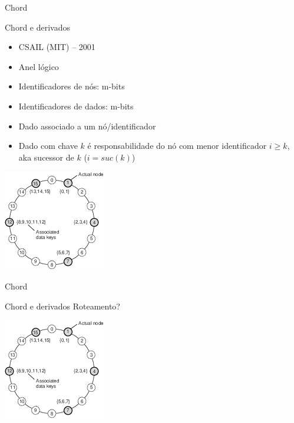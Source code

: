 \begin{frame}{Chord}
\begin{beamerboxesrounded}{Chord e derivados}
	\begin{itemize}
		\item CSAIL (MIT) -- 2001
		\item Anel lógico
		\item Identificadores de nós: m-bits
		\item Identificadores de dados: m-bits
		\item Dado associado a um nó/identificador
		\item Dado com chave $k$ é responsabilidade do nó com menor identificador $i \geq k$, aka sucessor de $k$ ($i = suc(k)$)
	\end{itemize}
\end{beamerboxesrounded}

\pause
\includegraphics[width=.45\textwidth]{images/02-07}	
\end{frame}

\begin{frame}{Chord }
\begin{beamerboxesrounded}{Chord e derivados}
Roteamento?
\end{beamerboxesrounded}

\includegraphics[width=.45\textwidth]{images/02-07}	
\end{frame}


